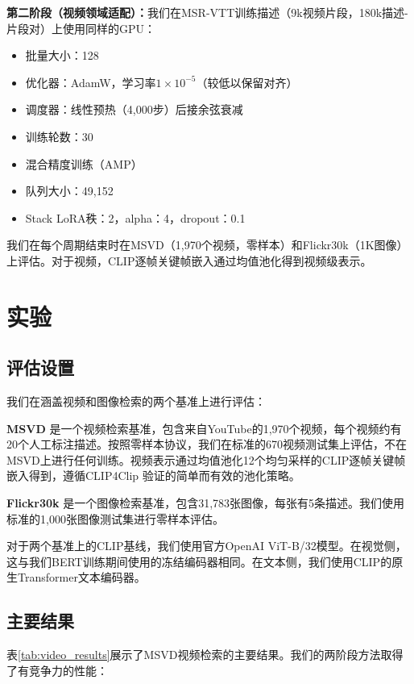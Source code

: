 \documentclass[10pt,a4paper]{ctexart}
\begin{document}
\textbf{第二阶段（视频领域适配）：}我们在MSR-VTT训练描述（9k视频片段，180k描述-片段对）上使用同样的GPU：
\begin{itemize}
  \item 批量大小：128
  \item 优化器：AdamW，学习率$1\times 10^{-5}$（较低以保留对齐）
  \item 调度器：线性预热（4,000步）后接余弦衰减
  \item 训练轮数：30
  \item 混合精度训练（AMP）
  \item 队列大小：49,152
  \item Stack LoRA秩：2，alpha：4，dropout：0.1
\end{itemize}
我们在每个周期结束时在MSVD（1,970个视频，零样本）和Flickr30k（1K图像）上评估。对于视频，CLIP逐帧关键帧嵌入通过均值池化得到视频级表示。

\section{实验}

\subsection{评估设置}

我们在涵盖视频和图像检索的两个基准上进行评估：

\textbf{MSVD} \citep{chen2011collecting}是一个视频检索基准，包含来自YouTube的1,970个视频，每个视频约有20个人工标注描述。按照零样本协议，我们在标准的670视频测试集上评估，不在MSVD上进行任何训练。视频表示通过均值池化12个均匀采样的CLIP逐帧关键帧嵌入得到，遵循CLIP4Clip \citep{luo2022clip4clip}验证的简单而有效的池化策略。

\textbf{Flickr30k} \citep{young2014flickr30k}是一个图像检索基准，包含31,783张图像，每张有5条描述。我们使用标准的1,000张图像测试集进行零样本评估。

对于两个基准上的CLIP基线，我们使用官方OpenAI ViT-B/32模型。在视觉侧，这与我们BERT训练期间使用的冻结编码器相同。在文本侧，我们使用CLIP的原生Transformer文本编码器。

\subsection{主要结果}

表\ref{tab:video_results}展示了MSVD视频检索的主要结果。我们的两阶段方法取得了有竞争力的性能：
\end{document}
